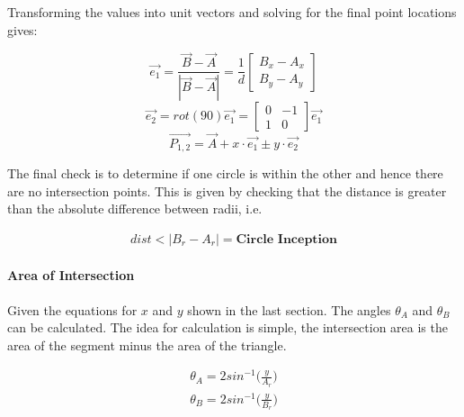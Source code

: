 \documentclass[11pt,twoside]{report}
\begin{document}
Transforming the values into unit vectors and solving for the final point locations gives:

\begin{equation}
 \overrightarrow{e_{1}} = \frac{ \overrightarrow{B}- \overrightarrow{A}}{|  \overrightarrow{B} -  \overrightarrow{A} |} 
= 
\frac{1}{d}
\begin{bmatrix}
B_{x} - A_{x} \\
B_{y} - A_{y}
\end{bmatrix} 
\end{equation}
\begin{equation}
\overrightarrow{e_{2}} =
rot(90) \overrightarrow{e_{1}} =
\begin{bmatrix}
0 & -1 \\
1 & 0
\end{bmatrix}
\overrightarrow{e_{1}}
\end{equation}
\begin{equation}
\overrightarrow{P_{1,2}} = \overrightarrow{A}+x \cdot \overrightarrow{e_{1}} \pm y \cdot \overrightarrow{e_{2}}
\label{inter_point_eq3}
\end{equation}

The final check is to determine if one circle is within the other and hence there are no intersection points. This is given by checking that the distance is greater than the absolute difference between radii, i.e.


\begin{equation}
\begin{aligned}
dist < |B_{r} - A_{r}| = \textbf{Circle Inception}
\end{aligned}
\label{circle_inception}
\end{equation}


\paragraph{Area of Intersection}

Given the equations for $x$ and $y$ shown in the last section. The angles $\theta_{A}$ and $\theta_{B}$ can be calculated. The idea for calculation is simple, the intersection area is the area of the segment minus the area of the triangle.


\begin{equation}
\begin{aligned}
\theta_{A} = 2sin^{-1} \bigg ( \frac{y}{A_{r}} \bigg )
\\
\theta_{B} = 2sin^{-1} \bigg ( \frac{y}{B_{r}} \bigg )
\end{aligned}
\label{circle_area_eq1}
\end{equation}
\end{document}

